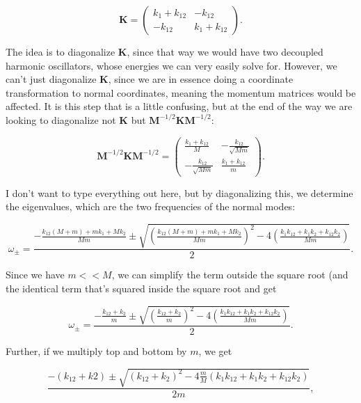 \begin{equation}
  \mathbf{K} = \begin{pmatrix}k_1 + k_{12} & -k_{12} \\ -k_{12} & k_1 + k_{12}\end{pmatrix}.
\end{equation}

The idea is to diagonalize $\mathbf{K}$, since that way we would have two decoupled harmonic oscillators, whose energies we can very easily solve for. However, we can't just diagonalize $\mathbf{K}$, since we are in essence doing a coordinate transformation to normal coordinates, meaning the momentum matrices would be affected. It is this step that is a little confusing, but at the end of the way we are looking to diagonalize not $\mathbf{K}$ but $\mathbf{M}^{-1/2}\mathbf{K}\mathbf{M}^{-1/2}$:

\begin{equation}
  \mathbf{M}^{-1/2}\mathbf{K}\mathbf{M}^{-1/2} = \begin{pmatrix}\frac{k_1 + k_{12}}{M} & - \frac{k_{12}}{\sqrt{Mm}} \\ - \frac{k_{12}}{\sqrt{Mm}} & \frac{k_1 + k_{12}}{m}\end{pmatrix}.
\end{equation}

I don't want to type everything out here, but by diagonalizing this, we determine the eigenvalues, which are the two frequencies of the normal modes:

\begin{equation}
  \omega_\pm = \frac{-\frac{k_{12}(M + m) + mk_1 + Mk_2}{Mm} \pm \sqrt{\left( \frac{k_{12}(M + m) + mk_1 + Mk_2}{Mm} \right)^2 - 4\left( \frac{k_1k_{12} + k_1k_2 + k_{12}k_2}{Mm} \right)}}{2}.
\end{equation}

Since we have $m << M$, we can simplify the term outside the square root (and the identical term that's squared inside the square root and get

\begin{equation}
  \omega_\pm = \frac{- \frac{k_{12} + k_2}{m} \pm \sqrt{\left( \frac{k_{12} + k_2}{m} \right)^2 - 4\left( \frac{k_1k_{12} + k_1k_2 + k_{12}k_2}{Mm} \right)}}{2}.
\end{equation}

Further, if we multiply top and bottom by $m$, we get

\begin{equation}
  \frac{-(k_{12} + k2) \pm \sqrt{(k_{12} + k_2)^2 - 4 \frac{m}{M}(k_1k_{12} + k_1k_2 + k_{12}k_2)}}{2m},
\end{equation}

